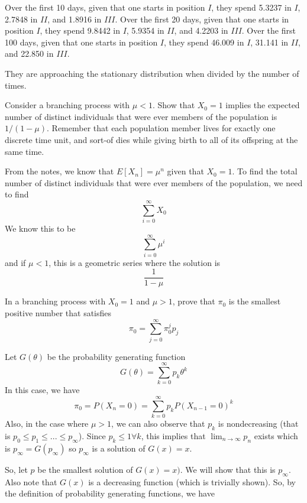 \documentclass[10pt,a4paper]{exam}
\begin{document}
\begin{questions}
\begin{solution}
Over the first 10 days, given that one starts in position $I$, they spend 5.3237  in $I$, 2.7848 in $II$, and 1.8916 in $III$. Over the first 20 days, given that one starts in position $I$, they spend 9.8442  in $I$, 5.9354 in $II$, and 4.2203 in $III$. Over the first 100 days, given that one starts in position $I$, they spend 46.009  in $I$, 31.141 in $II$, and 22.850 in $III$.

They are approaching the stationary distribution when divided by the number of times.
\end{solution}

\question Consider a branching process with $\mu < 1$. Show that $X_0 = 1$ implies the expected number of distinct individuals that were ever members of the population is $1/(1-\mu)$. Remember that each population member lives for exactly one discrete time unit, and sort-of dies while giving birth to all of its offspring at the same time.

\begin{solution}
From the notes, we know that $E[X_n] = \mu^n$ given that $X_0= 1.$ To find the total number of distinct individuals that were ever members of the population, we need to find
$$\sum_{i=0}^\infty X_0$$
We know this to be 
$$\sum_{i=0}^\infty \mu^i$$
and if $\mu < 1$, this is a geometric series where the solution is 
$$\dfrac{1}{1-\mu}$$
\end{solution}

\pagebreak









\question In a branching process with $X_0 = 1$ and $\mu > 1$, prove that $\pi_0$ is the smallest positive number that satisfies
$$\pi_0 = \sum_{j=0}^\infty \pi_0^jp_j$$
\begin{solution}
Let $G(\theta)$ be the probability generating function
$$G(\theta) = \sum_{k = 0}^{\infty} p_k\theta^k$$
In this case, we have
$$\pi_0 = P(X_n = 0) = \sum_{k=0}^\infty p_k P(X_{n-1} = 0)^k$$
Also, in the case where $\mu > 1$, we can also observe that $p_k$ is nondecreasing (that is $p_0 \leq p_1 \leq ... \leq p_\infty$).  Since $p_k \leq 1 \forall k$, this implies that $\lim_{n \to \infty} p_n$ exists which is
$p_\infty = G(p_\infty)$ so $p_\infty$ is a solution of $G(x) = x$.

So, let $p$ be the smallest solution of $G(x) = x)$. We will show that this is $p_\infty$. Also note that $G(x)$ is a decreasing function (which is trivially shown). So, by the definition of probability generating functions, we have


\end{solution}
\end{questions}
\end{document}
